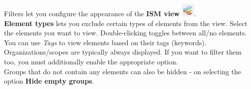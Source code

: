 \documentclass[a4paper,10pt]{book}
\begin{document}
\newline
Filters let you configure the appearance of the \textbf{ISM view}
\includegraphics[height=2ex]{Icon/Informationssicherheitsmodell.png}.
\newline\\
\textbf{Element types} lets you exclude certain types of elements from the view.
Select the elements you want to view. Double-clicking toggles between all/no elements.
\newline\\
You can use {\em Tags} to view elements based on their tags (keywords). Organizations/scopes are
typically always displayed. If you want to filter them too, you must additionally enable the appropriate option.
\newline\\
Groups that do not contain any elements can also be hidden - on selecting the option \textbf{Hide empty groups}.
\end{document}
